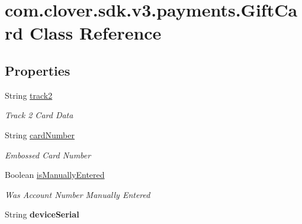 \hypertarget{classcom_1_1clover_1_1sdk_1_1v3_1_1payments_1_1_gift_card}{}\section{com.\+clover.\+sdk.\+v3.\+payments.\+Gift\+Card Class Reference}
\label{classcom_1_1clover_1_1sdk_1_1v3_1_1payments_1_1_gift_card}
\subsection*{Properties}
\begin{DoxyCompactItemize}
\item 
String \hyperlink{classcom_1_1clover_1_1sdk_1_1v3_1_1payments_1_1_gift_card_a1820ebe9fb6e663ec797bc05595bb799}{track2}
\begin{DoxyCompactList}\small\item\em Track 2 Card Data \end{DoxyCompactList}\item 
String \hyperlink{classcom_1_1clover_1_1sdk_1_1v3_1_1payments_1_1_gift_card_a3a8d12c8c11e7757ca2c9e67ca5ff3f0}{card\+Number}
\begin{DoxyCompactList}\small\item\em Embossed Card Number \end{DoxyCompactList}\item 
Boolean \hyperlink{classcom_1_1clover_1_1sdk_1_1v3_1_1payments_1_1_gift_card_a384d53479b91d5f99819e377d853c97a}{is\+Manually\+Entered}
\begin{DoxyCompactList}\small\item\em Was Account Number Manually Entered \end{DoxyCompactList}\item 
\mbox{\label{classcom_1_1clover_1_1sdk_1_1v3_1_1payments_1_1_gift_card_aa2564f5d2f6b5a8604aafdb85aaf8c8d}} 
String {\bfseries device\+Serial}
\end{DoxyCompactItemize}


